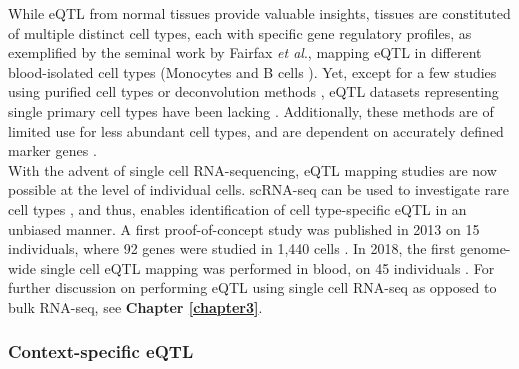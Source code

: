 While eQTL from normal tissues provide valuable insights, tissues are constituted of multiple distinct cell types, each with specific gene regulatory profiles, as exemplified by the seminal work by Fairfax \textit{et al}., mapping eQTL in different blood-isolated cell types (Monocytes and B cells \cite{fairfax2012genetics}).
Yet, except for a few studies using purified cell types \cite{fairfax2012genetics, kasela2017pathogenic, naranbhai2015genomic} or deconvolution methods \cite{westra2015cell, venet2001separation},
eQTL datasets representing single primary cell types
have been lacking \cite{zhang2018cell}.
Additionally, these methods are 
of limited use for less abundant cell types, and are dependent on accurately defined marker genes \cite{zhernakova2017identification}. \\
 
With the advent of single cell RNA-sequencing, eQTL mapping studies are now possible at the level of individual cells. 
scRNA-seq can be used to investigate rare cell types \cite{villani2017single}, and thus, enables identification of cell type-specific eQTL in an unbiased manner. 
A first proof-of-concept study was published in 2013 on 15 individuals, where 92 genes were studied in 1,440 cells \cite{wills2013single}.
In 2018, the first genome-wide single cell eQTL mapping was performed in blood, on 45 individuals \cite{van2018single}.
For further discussion on performing eQTL using single cell RNA-seq as opposed to bulk RNA-seq, see \textbf{Chapter 
\ref{chapter3}}.

\subsubsection{Context-specific eQTL}

